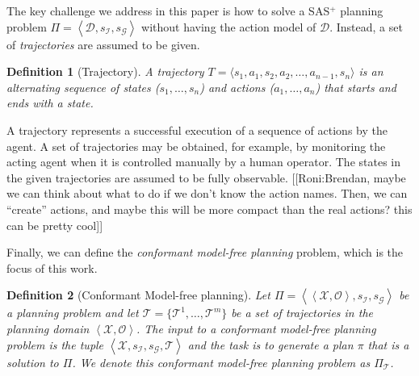 \documentclass{article}
\newtheorem{definition}{Definition}
\newcommand{\tuple}[1]{\ensuremath{\left \langle #1 \right \rangle }}
\newcommand{\SAS}{SAS$^+$}
\newcommand{\roni}[1]{[[Roni:#1]]}
\begin{document}
	The key challenge we address in this paper is how to solve a \SAS{} 
	planning problem $\Pi=\tuple{\mathcal{D},s_\mathcal{I}, s_\mathcal{G}}$ without having the action model of $\mathcal{D}$. Instead, a set of {\em trajectories} are assumed to be given. 
	\begin{definition}[Trajectory]
		A trajectory $T=\langle s_1, a_1, s_2, a_2, \ldots, a_{n-1}, s_n\rangle$ is an alternating sequence of states ($s_1,\ldots,s_n$) and actions ($a_1,\ldots,a_n$) that starts and ends with a state. 
	\end{definition}
	A trajectory represents a successful execution of a sequence of actions by the agent. A set of trajectories may be obtained, for example, by monitoring the acting agent when it is controlled manually by a human operator. The states in the given trajectories are assumed to be fully observable. 
	\roni{Brendan, maybe we can think about what to do if we don't know the action names. Then, we can ``create'' actions, and maybe this will be more compact than the real actions? this can be pretty cool}
	
	Finally, we can define the {\em conformant model-free planning} problem, which is the focus of this work. 
	
	\begin{definition}[Conformant Model-free planning]
		Let $\Pi=\tuple{\tuple{\mathcal{X},\mathcal{O}},s_\mathcal{I}, s_\mathcal{G}}$ be a planning 
		problem and let $\mathcal{T}=\{\mathcal{T}^1,\ldots,\mathcal{T}^m\}$ be a set of trajectories in 
		the planning domain $\tuple{\mathcal{X},\mathcal{O}}$. 
		The input to a conformant model-free planning problem is 
		the tuple $\tuple{\mathcal{X},s_\mathcal{I}, s_\mathcal{G}, \mathcal{T}}$
		and the task is to generate a plan $\pi$  that is a solution to $\Pi$. We denote this conformant model-free planning problem as $\Pi_\mathcal{T}$. 
		\label{def:model-free-planning}
	\end{definition}
	
	
\end{document}
